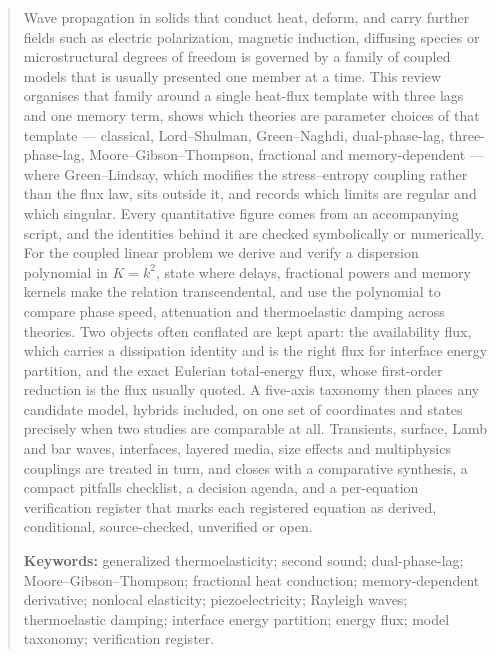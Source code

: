 
\begin{abstract}
Wave propagation in solids that conduct heat, deform, and carry further fields such as electric
polarization, magnetic induction, diffusing species or microstructural degrees of freedom is governed by a
family of coupled models that is usually presented one member at a time. This review organises that family
around a single heat-flux template with three lags and one memory term, shows which theories are parameter choices of that template --- classical, Lord--Shulman,
Green--Naghdi, dual-phase-lag, three-phase-lag, Moore--Gibson--Thompson, fractional and memory-dependent ---
where Green--Lindsay, which modifies the stress--entropy coupling rather than the flux law, sits outside it,
and records which limits are regular and which singular. Every quantitative figure comes from an accompanying script, and the
identities behind it are checked symbolically or numerically. For the coupled linear problem we derive and verify a dispersion polynomial in
$K=k^2$, state where delays, fractional powers and memory kernels make the relation transcendental, and
use the polynomial to compare phase speed, attenuation and thermoelastic damping across theories. Two
objects often conflated are kept apart: the availability flux, which carries a
dissipation identity and is the right flux for interface energy partition, and the exact Eulerian
total-energy flux, whose first-order reduction is the flux usually quoted. A five-axis taxonomy then
places any candidate model, hybrids included, on one set of coordinates and states precisely when two studies are
comparable at all. Transients, surface, Lamb and bar waves, interfaces, layered media, size effects and multiphysics
couplings are treated in turn, and closes with a comparative synthesis, a compact pitfalls
checklist, a decision agenda, and a per-equation verification register that marks each registered equation
as derived, conditional, source-checked, unverified or open.
\medskip

\noindent\textbf{Keywords:} generalized thermoelasticity; second sound; dual-phase-lag;
Moore--Gibson--Thompson; fractional heat conduction; memory-dependent derivative; nonlocal elasticity;
piezoelectricity; Rayleigh waves; thermoelastic damping; interface energy partition; energy flux;
model taxonomy; verification register.
\end{abstract}

